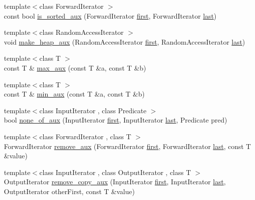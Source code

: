 \begin{DoxyCompactItemize}
\item 
{\footnotesize template$<$class Forward\+Iterator $>$ }\\const bool \hyperlink{namespaceprism_a29c1478cf9a6f78fa511d96f93b22791}{is\+\_\+sorted\+\_\+aux} (Forward\+Iterator \hyperlink{namespaceprism_ae3fb7a1926a9e8e59300cd5e370470da}{first}, Forward\+Iterator \hyperlink{namespaceprism_abe4956c4e865f55ca126b7fb973b5078}{last})
\item 
{\footnotesize template$<$class Random\+Access\+Iterator $>$ }\\void \hyperlink{namespaceprism_a567b63d0d3fa2bc8bdba883f152848be}{make\+\_\+heap\+\_\+aux} (Random\+Access\+Iterator \hyperlink{namespaceprism_ae3fb7a1926a9e8e59300cd5e370470da}{first}, Random\+Access\+Iterator \hyperlink{namespaceprism_abe4956c4e865f55ca126b7fb973b5078}{last})
\item 
{\footnotesize template$<$class T $>$ }\\const T \& \hyperlink{namespaceprism_a9d5ae6f65d12dcb2e433ffdc95b733bb}{max\+\_\+aux} (const T \&a, const T \&b)
\item 
{\footnotesize template$<$class T $>$ }\\const T \& \hyperlink{namespaceprism_a5ded05d282e95b0ab21c6aeaca2e8794}{min\+\_\+aux} (const T \&a, const T \&b)
\item 
{\footnotesize template$<$class Input\+Iterator , class Predicate $>$ }\\bool \hyperlink{namespaceprism_a4333d241a3ee0f8bce307db84c7eba23}{none\+\_\+of\+\_\+aux} (Input\+Iterator \hyperlink{namespaceprism_ae3fb7a1926a9e8e59300cd5e370470da}{first}, Input\+Iterator \hyperlink{namespaceprism_abe4956c4e865f55ca126b7fb973b5078}{last}, Predicate pred)
\item 
{\footnotesize template$<$class Forward\+Iterator , class T $>$ }\\Forward\+Iterator \hyperlink{namespaceprism_acb7d8d4b86592081686e15ee7a18f856}{remove\+\_\+aux} (Forward\+Iterator \hyperlink{namespaceprism_ae3fb7a1926a9e8e59300cd5e370470da}{first}, Forward\+Iterator \hyperlink{namespaceprism_abe4956c4e865f55ca126b7fb973b5078}{last}, const T \&value)
\item 
{\footnotesize template$<$class Input\+Iterator , class Output\+Iterator , class T $>$ }\\Output\+Iterator \hyperlink{namespaceprism_ae3f41bf6d9ab98a87d693fba69f138dc}{remove\+\_\+copy\+\_\+aux} (Input\+Iterator \hyperlink{namespaceprism_ae3fb7a1926a9e8e59300cd5e370470da}{first}, Input\+Iterator \hyperlink{namespaceprism_abe4956c4e865f55ca126b7fb973b5078}{last}, Output\+Iterator other\+First, const T \&value)

\end{DoxyCompactItemize}
